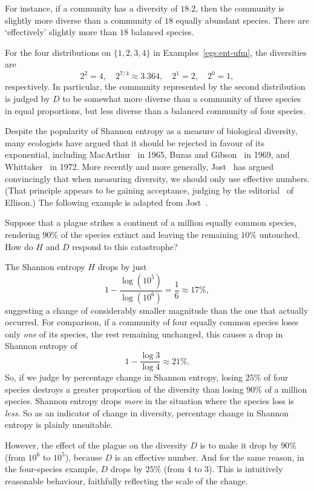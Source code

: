 For instance, if a community has a diversity of $18.2$, then the community
is slightly more diverse than a community of $18$ equally abundant species.
There are `effectively' slightly more than $18$ balanced species.

\begin{examples}
For the four distributions on $\{1, 2, 3, 4\}$ in
Examples~\ref{egs:ent-ufm}, the diversities are
\[
2^2 = 4, 
\quad
2^{7/4} \approx 3.364,
\quad
2^1 = 2,
\quad
2^0 = 1,
\]
respectively.  In particular, the community represented by the second
distribution is judged by $D$ to be somewhat more diverse than a community
of three species in equal proportions, but less diverse than a balanced
community of four species.
\end{examples}

Despite the popularity of Shannon entropy as a measure of biological
diversity, many ecologists have argued that it should be rejected in favour
of its exponential, including MacArthur~\cite{MacA} in 1965, Buzas and
Gibson~\cite{BuGi} in 1969, and Whittaker~\cite{WhitEMS} in 1972.  More
recently and more generally, Jost~\cite{JostED,JostPDI,JostMBD} has argued
convincingly that when measuring diversity, we should only use effective
numbers.  (That principle appears to be gaining acceptance, judging by the
editorial~\cite{ElliPD} of Ellison.)  The following example is adapted from
Jost~\cite{JostPDI}.%
%

\begin{example}
%
%
% 
Suppose that a plague strikes a continent of a million equally common
species, rendering $90\%$ of the species extinct and leaving the remaining
$10\%$ untouched.  How do $H$ and $D$ respond to this catastrophe?

The Shannon entropy $H$ drops by just
\[
1 - \frac{\log(10^5)}{\log(10^6)} = \frac{1}{6} \approx 17\%,
\]
suggesting a change of considerably smaller magnitude than the one that
actually occurred.  For comparison, if a community of four equally common
species loses only \emph{one} of its species, the rest remaining unchanged,
this causes a drop in Shannon entropy of
\[
1 - \frac{\log 3}{\log 4} \approx 21\%.
\]
So, if we judge by percentage change in Shannon entropy, losing $25\%$ of
four species destroys a greater proportion of the diversity than losing
$90\%$ of a million species.  Shannon entropy drops \emph{more} in the
situation where the species loss is \emph{less}.  So as an indicator of
change in diversity, percentage change in Shannon entropy is plainly
unsuitable. 

However, the effect of the plague on the diversity $D$ is to make it drop
by $90\%$ (from $10^6$ to $10^5$), because $D$ is an effective number.  And
for the same reason, in the four-species example, $D$ drops by $25\%$ (from
$4$ to $3$).  This is intuitively reasonable behaviour, faithfully
reflecting the scale of the change.
\end{example}

